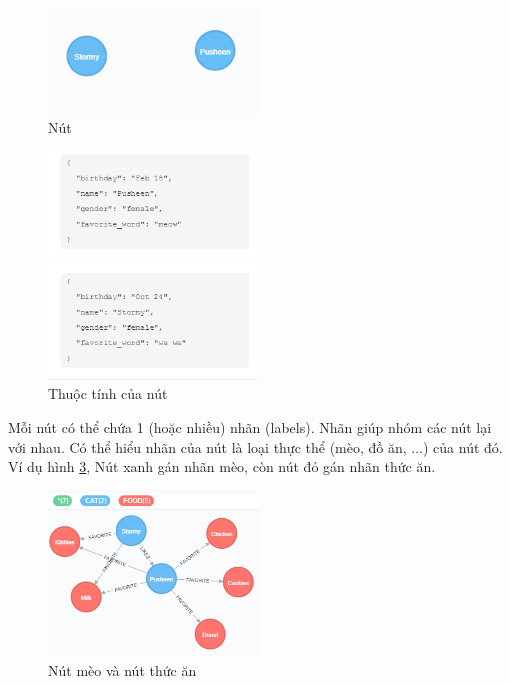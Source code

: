\begin{figure}[h]
\centering
\includegraphics[width=0.5\textwidth]{image/node.PNG}
\caption{\label{fig:node} Nút}
\end{figure}

\begin{figure}[h]
\centering
\includegraphics[width=0.5\textwidth]{image/thuoc_tinh.PNG}
\caption{\label{fig:node} Thuộc tính của nút}
\end{figure}

Mỗi nút có thể chứa 1 (hoặc nhiều) nhãn (labels). Nhãn giúp nhóm các nút lại với nhau. Có thể hiểu nhãn của nút là loại thực thể (mèo, đồ ăn, ...) của nút đó. Ví dụ hình \ref{fig:catfoodnode}, Nút xanh gán nhãn mèo, còn nút đỏ gán nhãn thức ăn.

\begin{figure}[h]
\centering
\includegraphics[width=0.5\textwidth]{image/complete_node_with_cat_and_food.PNG}
\caption{\label{fig:catfoodnode} Nút mèo và nút thức ăn}
\end{figure}


